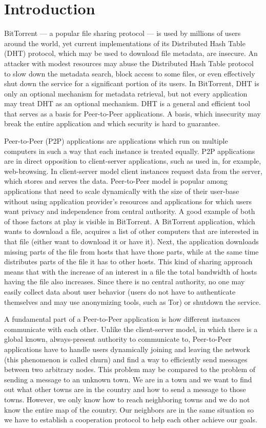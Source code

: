 \chapter{Introduction}

BitTorrent --- a popular file sharing protocol --- is used by millions of users
around the world, yet current implementations of its Distributed Hash Table
(DHT) protocol, which may be used to download file metadata, are insecure.
An attacker with modest resources may abuse the Distributed Hash Table protocol
to slow down the metadata search, block access to some files, or even
effectively shut down the service for a significant portion of its users.
In BitTorrent, DHT is only an optional mechanism for metadata
retrieval, but not every application may treat DHT as an optional mechanism.
DHT is a general and efficient tool that serves as a basis for Peer-to-Peer
applications.
A basis, which insecurity may break the entire application and which security is
hard to guarantee.

Peer-to-Peer (P2P) applications are applications which run on multiple computers
in such a way that each instance is treated equally.
P2P applications are in direct opposition to client-server applications, such as
used in, for example, web-browsing.
In client-server model client instances request data from the server, which
stores and serves the data.
Peer-to-Peer model is popular among applications that need to scale dynamically
with the size of their user-base without using application provider's resources
and applications for which users want privacy and independence from central
authority.
A good example of both of those factors at play is visible in BitTorrent.
A BitTorrent application, which wants to download a file, acquires a list of
other computers that are interested in that file (either want to download it or
have it).
Next, the application downloads missing parts of the file from hosts that have
those parts, while at the same time distributes parts of the file it has to
other hosts.
This kind of sharing approach means that with the increase of an interest in a
file the total bandwidth of hosts having the file also increases.
Since there is no central authority, no one may easily collect data about user
behavior (users do not have to authenticate themselves and may use anonymizing
tools, such as Tor) or shutdown the service.

A fundamental part of a Peer-to-Peer application is how different instances
communicate with each other.
Unlike the client-server model, in which there is a global known, always-present
authority to communicate to, Peer-to-Peer applications have to handle users
dynamically joining and leaving the network (this phenomenon is called churn)
and find a way to efficiently send messages between two arbitrary nodes.
This problem may be compared to the problem of sending a message to an unknown
town.
We are in a town and we want to find out what other towns are in the country and
how to send a message to those towns.
However, we only know how to reach neighboring towns and we do not know the
entire map of the country.
Our neighbors are in the same situation so we have to establish a cooperation
protocol to help each other achieve our goals.

